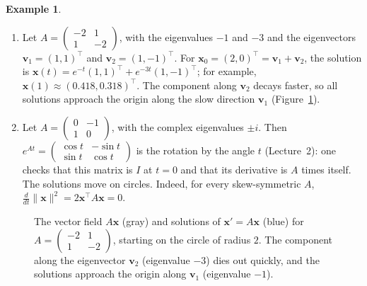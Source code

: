 \documentclass[11pt]{article}
\newcommand{\norm}[1]{\lVert #1 \rVert}
\theoremstyle{definition}
\newtheorem{example}[definition]{Example}
\theoremstyle{plain}
\theoremstyle{remark}
\begin{document}
\begin{example}\label{ex:linear-ode}
    \begin{enumerate}
        \item Let $A = \begin{pmatrix} -2 & 1 \\ 1 & -2 \end{pmatrix}$, with the eigenvalues $-1$ and $-3$ and the eigenvectors $\mathbf{v}_1 = (1, 1)^\top$ and $\mathbf{v}_2 = (1, -1)^\top$. For $\mathbf{x}_0 = (2, 0)^\top = \mathbf{v}_1 + \mathbf{v}_2$, the solution is $\mathbf{x}(t) = e^{-t}(1, 1)^\top + e^{-3t}(1, -1)^\top$; for example, $\mathbf{x}(1) \approx (0.418, 0.318)^\top$. The component along $\mathbf{v}_2$ decays faster, so all solutions approach the origin along the slow direction $\mathbf{v}_1$ (Figure~\ref{fig:ode}).
        \item Let $A = \begin{pmatrix} 0 & -1 \\ 1 & 0 \end{pmatrix}$, with the complex eigenvalues $\pm i$. Then $e^{At} = \begin{pmatrix} \cos t & -\sin t \\ \sin t & \cos t \end{pmatrix}$ is the rotation by the angle $t$ (Lecture~2): one checks that this matrix is $I$ at $t = 0$ and that its derivative is $A$ times itself. The solutions move on circles. Indeed, for every skew-symmetric $A$, $\frac{d}{dt}\norm{\mathbf{x}}^2 = 2\mathbf{x}^\top A\mathbf{x} = 0$.
    \end{enumerate}
\end{example}

\begin{figure}[ht]
    \centering
    \caption{The vector field $A\mathbf{x}$ (gray) and solutions of $\mathbf{x}' = A\mathbf{x}$ (blue) for $A = \left(\begin{smallmatrix} -2 & 1 \\ 1 & -2 \end{smallmatrix}\right)$, starting on the circle of radius $2$. The component along the eigenvector $\mathbf{v}_2$ (eigenvalue $-3$) dies out quickly, and the solutions approach the origin along $\mathbf{v}_1$ (eigenvalue $-1$).}
    \label{fig:ode}
\end{figure}
\end{document}
